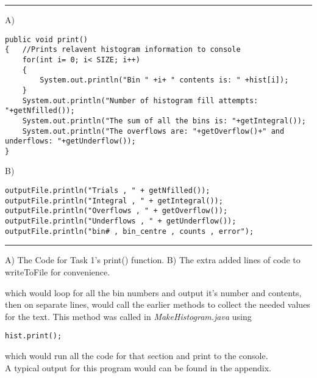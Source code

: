 \documentclass{article}
\begin{document}
\begin{multicols}{2}
\begin{table*}
	\hrule
	A)
	\begin{lstlisting}
public void print() 
{	//Prints relavent histogram information to console
	for(int i= 0; i< SIZE; i++)
	{
		System.out.println("Bin " +i+ " contents is: " +hist[i]);
	}
	System.out.println("Number of histogram fill attempts: "+getNfilled());
	System.out.println("The sum of all the bins is: "+getIntegral());
	System.out.println("The overflows are: "+getOverflow()+" and underflows: "+getUnderflow());
}
	\end{lstlisting}
	B)
	\begin{lstlisting}
outputFile.println("Trials , " + getNfilled());
outputFile.println("Integral , " + getIntegral());
outputFile.println("Overflows , " + getOverflow());
outputFile.println("Underflows , " + getUnderflow());
outputFile.println("bin# , bin_centre , counts , error");
	\end{lstlisting}
	\hrule
	\caption{A) The Code for Task 1's print() function. B) The extra added lines of code to writeToFile for convenience.}
\end{table*}
	which would loop for all the bin numbers and output it's number and contents, then on separate lines, would call the earlier methods to collect the needed values for the text. This method was called in \textit{MakeHistogram.java} using 
	\begin{lstlisting}
hist.print();
	\end{lstlisting}
	which would run all the code for that section and print to the console. \\ \indent  A typical output for this program would can be found in the appendix.
	

\end{multicols}
\end{document}
